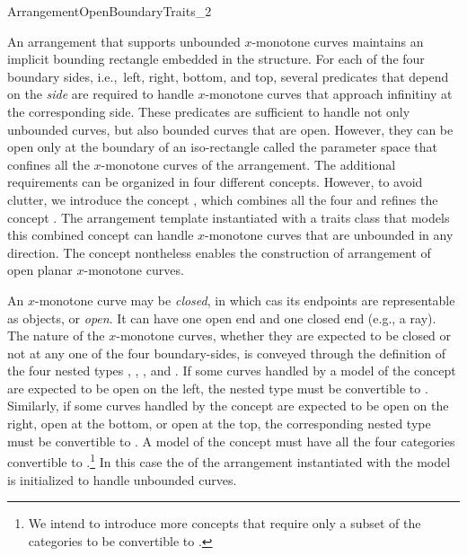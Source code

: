 
\ccRefPageBegin
\begin{ccRefConcept}{ArrangementOpenBoundaryTraits_2}

\ccDefinition
An arrangement that supports unbounded $x$-monotone curves maintains
an implicit bounding rectangle embedded in the \dcel{} structure.
For each of the four boundary sides, i.e.,~left, right, bottom, and
top, several predicates that depend on the \emph{side} are required
to handle $x$-monotone curves that approach infinitiny at the
corresponding side. These predicates are sufficient to handle not
only unbounded curves, but also bounded curves that are open.
However, they can be open only at the boundary of an iso-rectangle
called the parameter space that confines all the $x$-monotone curves
of the arrangement. The additional requirements can be organized in
four different concepts. However, to avoid clutter, we introduce the
concept \ccRefName, which combines all the four and refines the
concept . The arrangement template
instantiated with a traits class that models this combined concept
can handle $x$-monotone curves that are unbounded in any direction.
The concept \ccRefName{} nontheless enables the construction of
arrangement of open planar $x$-monotone curves. 

An $x$-monotone curve may be \emph{closed}, in which cas its endpoints
are representable as  objects, or \emph{open}. It can 
have one open end and one closed end (e.g., a ray). The nature of the
$x$-monotone curves, whether they are expected to be closed or not at
any one of the four boundary-sides, is conveyed through the definition
of the four nested types ,
, , and
. If some curves handled by a model of the
concept \ccRefName{} are expected to be open on the left, the nested
type  must be convertible to
. Similarly, if some curves handled by the
concept are expected to be open on the right, open at the bottom, or
open at the top, the corresponding nested type must be convertible to
. A model of the concept \ccRefName{} must have
all the four categories convertible to
.\footnote{We intend to introduce more concepts
that require only a subset of the categories to be convertible to
.} In this case the \dcel{} of the arrangement
instantiated with the model is initialized to handle unbounded curves.


\end{ccRefConcept}
